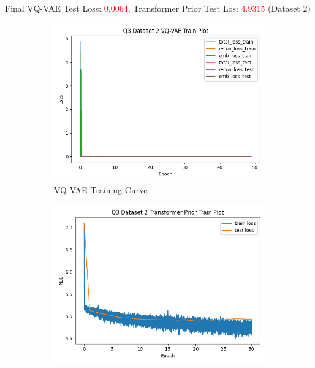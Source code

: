 \documentclass{article}
\begin{document}
   \newpage

   Final VQ-VAE Test Loss: \textcolor{red}{0.0064}, Transformer Prior Test Los: \textcolor{red}{4.9315} (Dataset 2)
   \begin{figure}[H]
          \centering
          \begin{subfigure}[b]{0.475\textwidth}
              \centering
              \includegraphics[width=\textwidth]{figures/q3_dset2_vqvae_train_plot.png}
              \caption{VQ-VAE Training Curve}
          \end{subfigure}
          \hfill
          \begin{subfigure}[b]{0.475\textwidth}
              \centering
              \includegraphics[width=\textwidth]{figures/q3_dset2_prior_train_plot.png}

\end{subfigure}
\end{figure}
\end{document}

